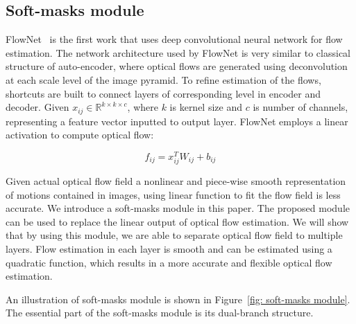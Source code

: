 \documentclass[10pt,twocolumn,letterpaper]{article}
\begin{document}
\subsection{Soft-masks module}
FlowNet~\cite{7410673} is the first work that uses deep convolutional neural network for flow estimation. The network architecture used by FlowNet is very similar to classical structure of auto-encoder, where optical flows are generated using deconvolution at each scale level of the image pyramid. To refine estimation of the flows, shortcuts are built to connect layers of corresponding level in encoder and decoder. Given $x_{ij}\in \mathbb{R}^{k\times k \times c}$, where $k$ is kernel size and $c$ is number of channels, representing a feature vector inputted to output layer. FlowNet employs a linear activation to compute optical flow:

\begin{equation}
f_{ij} = x^T_{ij} W_{ij} + b_{ij}  
\end{equation}

Given actual optical flow field a nonlinear and piece-wise smooth representation of motions contained in images, using linear function to fit the flow field is less accurate. We introduce a soft-masks module in this paper. The proposed module can be used to replace the linear output of optical flow estimation. We will show that by using this module, we are able to separate optical flow field to multiple layers. Flow estimation in each layer is smooth and can be estimated using a quadratic function, which results in a more accurate and flexible optical flow estimation. 

An illustration of soft-masks module is shown in Figure~\ref{fig: soft-masks module}. The essential part of the soft-masks module is its dual-branch structure.
\end{document}
